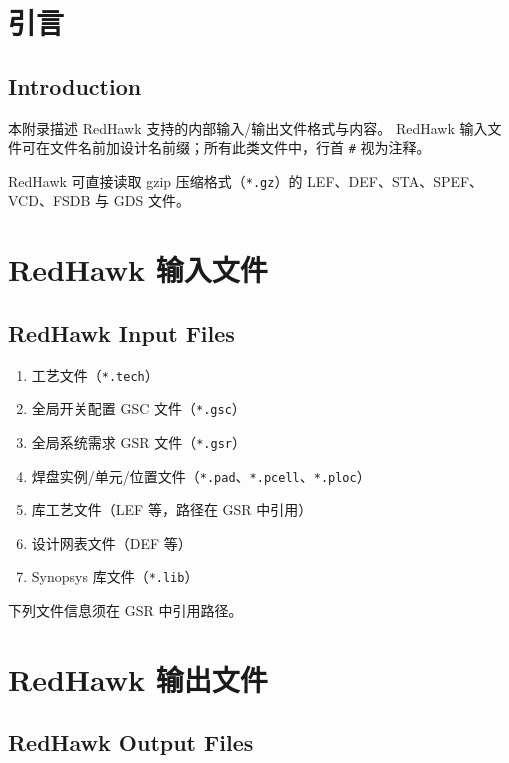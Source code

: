 \label{chap:files}

\section{引言}
\subsection*{Introduction}

本附录描述 RedHawk 支持的内部输入/输出文件格式与内容。
RedHawk 输入文件可在文件名前加设计名前缀；所有此类文件中，行首 \texttt{\#} 视为注释。

\begin{noteBox}
RedHawk 可直接读取 gzip 压缩格式（\texttt{*.gz}）的 LEF、DEF、STA、SPEF、VCD、FSDB 与 GDS 文件。
\end{noteBox}

\section{RedHawk 输入文件}
\subsection*{RedHawk Input Files}

\begin{enumerate}
\item 工艺文件（\texttt{*.tech}）
\item 全局开关配置 GSC 文件（\texttt{*.gsc}）
\item 全局系统需求 GSR 文件（\texttt{*.gsr}）
\item 焊盘实例/单元/位置文件（\texttt{*.pad}、\texttt{*.pcell}、\texttt{*.ploc}）
\item 库工艺文件（LEF 等，路径在 GSR 中引用）
\item 设计网表文件（DEF 等）
\item Synopsys 库文件（\texttt{*.lib}）
\end{enumerate}

下列文件信息须在 GSR 中引用路径。

\section{RedHawk 输出文件}
\subsection*{RedHawk Output Files}

